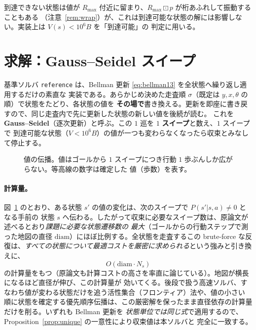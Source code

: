 \documentclass[11pt]{ltjsarticle}
\newcommand{\wmul}{\mathbin{\boxdot}}
\newcommand{\Rmax}{R_{\max}}        %
\begin{document}
\noindent
到達できない状態は値が $\Rmax$ 付近に留まり、$\Rmax\wmul p$ が桁あふれして振動することもある
（注意~\ref{rem:wrap}）が、これは到達可能な状態の解には影響しない。実装上は $V(s)<10^{6}B$ を「到達可能」の
判定に用いる。

\section{求解：Gauss--Seidel スイープ}
\label{sec:solve}

基準ソルバ \texttt{reference} は、Bellman 更新 \eqref{eq:bellman13} を全状態へ繰り返し適用するだけの素直な
実装である。あらかじめ決めた走査順 $\sigma$（既定は $y,x,\theta$ の順）で状態をたどり、各状態の値を
\textbf{その場で}書き換える。更新を即座に書き戻すので、同じ走査内で先に更新した状態の新しい値を後続が読む。
これを\textbf{Gauss--Seidel}（逐次更新）と呼ぶ。この $1$ 巡を $1$ \textbf{スイープ}と数え、$1$ スイープで
到達可能な状態（$V<10^{6}B$）の値が一つも変わらなくなったら収束とみなして停止する。

\begin{figure}[h]
\centering
{}
\caption{値の伝播。値はゴールから $1$ スイープにつき行動 $1$ 歩ぶんしか広がらない。等高線の数字は確定した
値（歩数）を表す。}
\label{fig:wavefront}
\end{figure}

\paragraph{計算量。}
図~\ref{fig:wavefront} のとおり、ある状態 $s'$ の値の変化は、次のスイープで $P(s'|s,a)\neq0$ となる手前の
状態 $s$ へ伝わる。したがって収束に必要なスイープ数は、原論文が述べるとおり\emph{課題に必要な状態遷移数の
最大}（ゴールからの行動ステップで測った地図の直径 $\mathrm{diam}$）にほぼ比例する。全状態を走査するこの
brute-force な反復は、\emph{すべての状態について最適コストを厳密に求められる}という強みと引き換えに、
\begin{equation}
O(\mathrm{diam}\cdot N_s)
\end{equation}
の計算量をもつ（原論文も計算コストの高さを率直に論じている）。地図が横長になるほど直径が伸び、この計算量が
効いてくる。後段で扱う高速ソルバ、すなわち値が変わる状態だけを追う活性集合（フロンティア）法や、値の小さい
順に状態を確定する優先順序伝播は、この厳密解を保ったまま直径依存の計算量だけを削る。いずれも Bellman 更新を
\emph{状態単位では同じ式}で適用するので、Proposition~\ref{prop:unique} の一意性により収束値は本ソルバと
完全に一致する。
\end{document}
